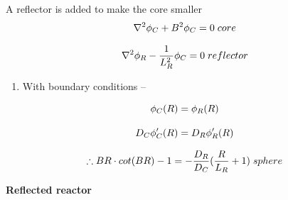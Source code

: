 \documentclass[aspectratio=1610,pdftex,dvipsnames,compress,xcolor={dvipsnames}]{beamer}
\begin{document}
\addtocounter{framenumber}{-1} 
\begin{frame}{A reflector is added to make the core smaller}
    \begin{equation}
        \LARGE
        \nabla^2 \phi_C + B^2 \phi_C = 0 \; core
    \end{equation}

    \begin{equation}
        \LARGE
        \nabla^2 \phi_R - \frac{1}{L^2_R} \phi_C = 0 \; reflector
    \end{equation}

    \vspace*{\fill}

    \begin{enumerate}[series=outerlist,topsep=0pt,itemsep=11pt,leftmargin=*,label=(\arabic*)]
        \item[]With boundary conditions --
    \end{enumerate}

    \vspace*{\fill}

    \begin{equation}
        \LARGE
        \phi_C(R) = \phi_R(R)
    \end{equation}

    \begin{equation}
        \LARGE
        D_C \phi'_C(R) = D_R\phi'_R(R)
    \end{equation}

    \begin{equation}
        \LARGE
        \therefore BR \cdot cot(BR) - 1 = -\frac{D_R}{D_C} (\frac{R}{L_R} + 1) \; sphere
    \end{equation}
\end{frame}


\begin{frame}[plain]{}
    \centering\LARGE\textbf{Reflected reactor}
\end{frame}
\end{document}
